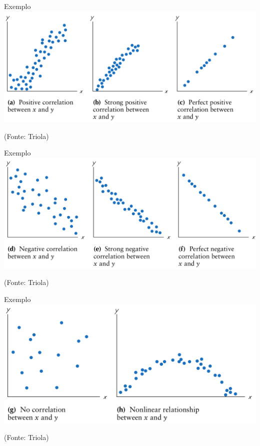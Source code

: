 \documentclass{beamer}
\begin{document}
\begin{frame}{Exemplo}
  \includegraphics[height=0.6\textheight]{Cap17/positive}

  (Fonte: Triola)
\end{frame}

\begin{frame}{Exemplo}
  \includegraphics[height=0.6\textheight]{Cap17/negative}

  (Fonte: Triola)
\end{frame}

\begin{frame}{Exemplo}
  \includegraphics[height=0.6\textheight]{Cap17/other}

  (Fonte: Triola)
\end{frame}

\end{document}

